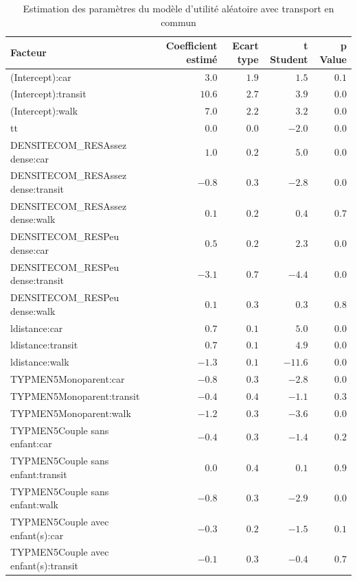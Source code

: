 \documentclass[
  9pt,
  a4paper,
  DIV=11]{scrreprt}
\begin{document}
\begin{longtable}{lrrrr}

\caption{\label{tbl-rum-tc}Estimation des paramètres du modèle d'utilité
aléatoire avec transport en commun}

\tabularnewline

\toprule
Facteur & Coefficient estimé & Ecart type & t Student & p Value \\ 
\midrule\addlinespace[2.5pt]
(Intercept):car & $3.0$ & $1.9$ & $1.5$ & $0.1$ \\ 
(Intercept):transit & $10.6$ & $2.7$ & $3.9$ & $0.0$ \\ 
(Intercept):walk & $7.0$ & $2.2$ & $3.2$ & $0.0$ \\ 
tt & $0.0$ & $0.0$ & $-2.0$ & $0.0$ \\ 
DENSITECOM\_RESAssez dense:car & $1.0$ & $0.2$ & $5.0$ & $0.0$ \\ 
DENSITECOM\_RESAssez dense:transit & $-0.8$ & $0.3$ & $-2.8$ & $0.0$ \\ 
DENSITECOM\_RESAssez dense:walk & $0.1$ & $0.2$ & $0.4$ & $0.7$ \\ 
DENSITECOM\_RESPeu dense:car & $0.5$ & $0.2$ & $2.3$ & $0.0$ \\ 
DENSITECOM\_RESPeu dense:transit & $-3.1$ & $0.7$ & $-4.4$ & $0.0$ \\ 
DENSITECOM\_RESPeu dense:walk & $0.1$ & $0.3$ & $0.3$ & $0.8$ \\ 
ldistance:car & $0.7$ & $0.1$ & $5.0$ & $0.0$ \\ 
ldistance:transit & $0.7$ & $0.1$ & $4.9$ & $0.0$ \\ 
ldistance:walk & $-1.3$ & $0.1$ & $-11.6$ & $0.0$ \\ 
TYPMEN5Monoparent:car & $-0.8$ & $0.3$ & $-2.8$ & $0.0$ \\ 
TYPMEN5Monoparent:transit & $-0.4$ & $0.4$ & $-1.1$ & $0.3$ \\ 
TYPMEN5Monoparent:walk & $-1.2$ & $0.3$ & $-3.6$ & $0.0$ \\ 
TYPMEN5Couple sans enfant:car & $-0.4$ & $0.3$ & $-1.4$ & $0.2$ \\ 
TYPMEN5Couple sans enfant:transit & $0.0$ & $0.4$ & $0.1$ & $0.9$ \\ 
TYPMEN5Couple sans enfant:walk & $-0.8$ & $0.3$ & $-2.9$ & $0.0$ \\ 
TYPMEN5Couple avec enfant(s):car & $-0.3$ & $0.2$ & $-1.5$ & $0.1$ \\ 
TYPMEN5Couple avec enfant(s):transit & $-0.1$ & $0.3$ & $-0.4$ & $0.7$ \\ 

\end{longtable}
\end{document}
